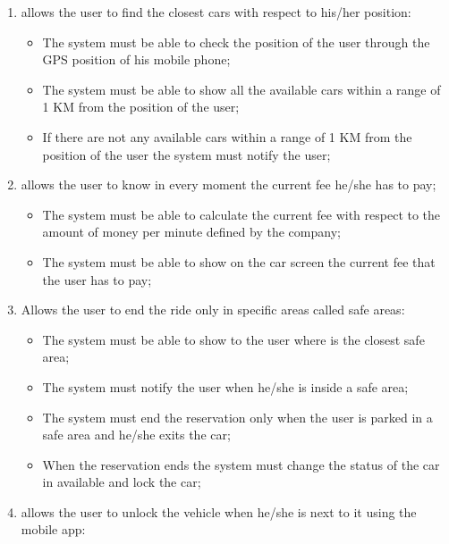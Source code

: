 \begin{enumerate}
\item allows the user to find the closest cars with respect to his/her position:

\begin{itemize}
\item The system must be able to check the position of the user through the GPS position of his mobile phone;
\item The system must be able to show all the available cars within a range of 1 KM from the position of the user;
\item If there are not any available cars within a range of 1 KM from the position of the user the system must notify the user;
\end{itemize}

\item allows the user to know in every moment the current fee he/she has to pay;

\begin{itemize}
\item The system must be able to calculate the current fee with respect to the amount of money per minute defined by the company;
\item The system must be able to show on the car screen the current fee that the user has to pay;
\end{itemize}

\item Allows the user to end the ride only in specific areas called safe areas:

\begin{itemize}
\item The system must be able to show to the user where is the closest safe area;
\item The system must notify the user when he/she is inside a safe area;
\item The system must end the reservation only when the user is parked in a safe area and he/she exits the car;
\item When the reservation ends the system must change the status of the car in available and lock the car;
\end{itemize}

\item allows the user to unlock the vehicle when he/she is next to it using the mobile app:


\end{enumerate}
